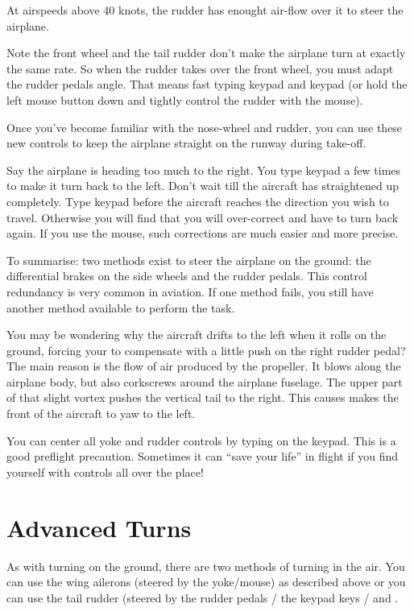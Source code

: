 At airspeeds above 40 knots, the rudder has enought air-flow over it to steer 
the airplane. 

Note the front wheel and the tail rudder don't make the airplane turn
at exactly the same rate. So when the rudder takes over the front wheel,
you must adapt the rudder pedals angle. That means fast typing keypad
 and keypad  (or hold the left mouse button down and
tightly control the rudder with the mouse).

Once you've become familiar with the nose-wheel and rudder, you can use these 
new controls to keep the airplane straight on the runway during take-off.

Say the airplane is heading too much to the right. You type
keypad  a few times to make it turn back to the left. Don't
wait till the aircraft has straightened up completely. Type keypad  
before the aircraft reaches the direction you wish to travel. Otherwise you will
find that you will over-correct and have to turn back again. If you use the 
mouse, such corrections are much easier and more precise.

To summarise: two methods exist to steer the airplane on the ground: the
differential brakes on the side wheels and the rudder pedals. This 
control redundancy is very common in aviation. If one method fails, 
you still have another method available to perform the task. 

You may be wondering why the aircraft drifts to the left when it rolls on the 
ground, forcing your to compensate with a little push on the right rudder 
pedal? The main reason is the flow of air produced by the propeller. It 
blows along the airplane body, but also corkscrews around the airplane 
fuselage. The upper part of that slight vortex pushes the vertical tail 
to the right. This causes makes the front of the aircraft to yaw to the left.

You can center all yoke and rudder controls by typing  on the
keypad. This is a good preflight precaution. Sometimes it can ``save
your life'' in flight if you find yourself with controls all over the place! 

\section{Advanced Turns}
\label{sec:Turning}
    
As with turning on the ground, there are two methods of turning in the air. 
You can use the wing ailerons (steered by the yoke/mouse) as described above or
you can use the tail rudder (steered by the rudder pedals / the
keypad keys / and .
    
